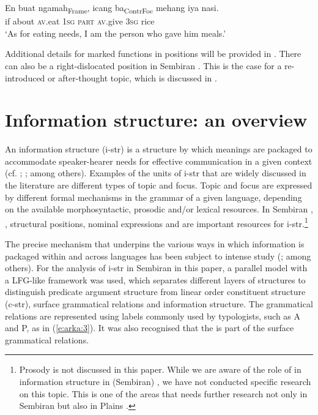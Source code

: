 \documentclass[output=paper
,modfonts
,nonflat]{langsci/langscibook}
\begin{document}
\begin{exe}
	\ex\label{e:arka:9}
	\gll {\ob}En  buat  ngamah{\cb}\textsubscript{Frame}, {\ob}icang   ba{\cb}\textsubscript{ContrFoc}   mehang  iya  nasi.\\
	\phantom{[}if   about   \textsc{av}.eat \phantom{[}1\textsc{sg}  \textsc{part}  \textsc{av}.give  3\textsc{sg}  rice \\
	\glt ‘As for eating needs, I am the person who gave him meals.’
\end{exe}

\noindent
Additional details for marked  functions in  positions will be provided in . There can also be a right-dislocated position in Sembiran . This is the case for a re-introduced or after-thought topic, which is discussed in . 

\section{\label{s:arka:3}Information structure: an overview}

An information structure (i-str) is a structure by which meanings are packaged to accommodate speaker-hearer needs for effective communication in a given  context (cf. \citealt[5]{Lambrecht1994}; \citealt[460]{Vallduví1996}; among others). Examples of the units of i-str that are widely discussed in the literature are different types of topic and focus. Topic and focus are expressed by different formal mechanisms in the grammar of a given language, depending on the available morphosyntactic, prosodic and/or lexical resources. In Sembiran , , structural positions, nominal expressions and  are important resources for i-str.\footnote{Prosody is not discussed in this paper. While we are aware of the role of  in information structure in (Sembiran) , we have not conducted specific research on this topic. This is one of the areas that needs further research not only in Sembiran  but also in Plains .}  

The precise mechanism that underpins the various ways in which information is packaged within and across languages has been subject to intense study (\citealt{Vallduví1996,Erteschick-Shir2007,Dalrymple2011}; among others). For the analysis of i-str in Sembiran  in this paper, a parallel model with a LFG-like framework was used, which separates different layers of structures to distinguish predicate argument structure from linear order constituent structure (c-str), surface grammatical relations and information structure. The grammatical relations are represented using labels commonly used by typologists, such as A and P, as in (\ref{e:arka:3}). It was also recognised that the  is part of the surface grammatical relations. 
\end{document}
